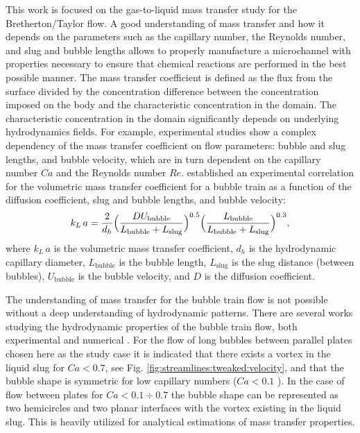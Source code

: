 \documentclass{article}
\newcommand{\vol}{k_L\,a}
\newcommand{\lbubble}{L_{\mathrm{bubble}}}
\newcommand{\lslug}{L_{\mathrm{slug}}}
\newcommand{\ububble}{U_{\mathrm{bubble}}}
\begin{document}
This work is focused on the gas-to-liquid mass transfer 
study for the Bretherton/Taylor flow. A good understanding of mass transfer and how it depends on the
parameters such as the capillary number, the Reynolds number, and slug and bubble lengths allows to properly
manufacture a microchannel with properties necessary to ensure that chemical
reactions are performed in the best possible manner. The mass transfer coefficient is defined as the flux from the 
surface divided by the concentration difference between the concentration imposed on the body and the characteristic concentration in the domain.
 The characteristic concentration in the domain significantly depends on underlying hydrodynamics fields. 
 For example, experimental studies \cite{yue-mass,bercic-mass} show a complex dependency of the mass transfer coefficient on flow parameters:
 bubble and slug lengths, and bubble velocity, which are in turn dependent on the capillary number $Ca$ and the Reynolds number $Re$. 
\citet{yue-mass} established an experimental correlation for the volumetric mass transfer coefficient for a bubble train as
a function of the diffusion coefficient, slug and bubble lengths, and bubble velocity: 
\begin{equation}
\vol =\frac{2}{d_h} \Bigl(\frac{D
\ububble}{\lbubble+\lslug}\Bigr)^{0.5}
\Bigl(\frac{\lbubble}{\lbubble+\lslug}\Bigr)^{0.3},
\end{equation}
where $\vol$ is the volumetric mass transfer coefficient, $d_h$ is the hydrodynamic capillary
diameter, $\lbubble$ is the bubble length, $\lslug$ is the slug distance (between bubbles),
$\ububble$ is the bubble velocity, and $D$ is the diffusion coefficient. 

The understanding of mass transfer for the bubble train flow is not possible without a deep understanding of hydrodynamic patterns.
There are several works studying the hydrodynamic properties of the bubble train flow, both
experimental \cite{kreutzer-pressure-drop,cerro-space,cerro-bubble-train} and numerical \cite{wang-non-circular,kuzmin-binary3d,giavedoni-numerical,heil-threedim}.
 For the flow of long bubbles between parallel plates chosen here as the study case it is indicated that  there exists a vortex 
in the liquid slug for $Ca<0.7$, see Fig. \ref{fig:streamlines:tweaked:velocity}, and that the bubble shape is symmetric for low capillary 
numbers ($Ca<0.1$ \cite{cerro-bubble-train}).  In the case of flow between plates for $Ca<0.1\div0.7$ the bubble
 shape can be represented as two hemicircles and two planar interfaces with the vortex existing in the liquid slug. This is heavily 
utilized for analytical estimations of mass transfer properties.
\end{document}
